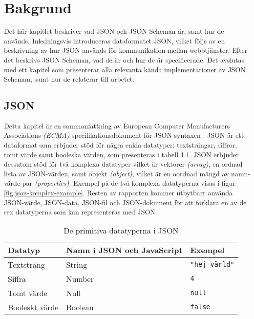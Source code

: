 \chapter{Bakgrund}
\label{sec:teori}
Det här kapitlet beskriver vad JSON och JSON Scheman är, samt hur de används. Inledningsvis introduceras dataformatet JSON, vilket följs av en beskrivning av hur JSON används för kommunikation mellan webbtjänster. Efter det beskrivs JSON Scheman, vad de är och hur de är specificerade. Det avslutas med ett kapitel som presenterar alla relevanta kända implementationer av JSON Scheman, samt hur de relaterar till arbetet.

\section{JSON}
\label{sec:teori:json}
Detta kapitel är en sammanfattning av European Computer Manufacturers Associations \textit{(ECMA)} specifikationsdokument för JSON syntaxen  \cite{ECMA2013}. JSON är ett dataformat som erbjuder stöd för några enkla datatyper: textsträngar, siffror, tomt värde samt booleska värden, som presenteras i tabell \ref{tab:json-primitives}. JSON erbjuder dessutom stöd för två komplexa datatyper vilket är vektorer \textit{(array)}, en ordnad lista av JSON-värden, samt objekt \textit{(object)}, vilket är en oordnad mängd av namn-värde-par \textit{(properties)}. Exempel på de två komplexa datatyperna visas i figur \ref{fig:json-komplex-example}. Resten av rapporten kommer utbytbart använda JSON-värde, JSON-data, JSON-fil och JSON-dokument för att förklara en av de sex datatyperna som kan representeras med JSON. \cite{ECMA2013}

\begin{table}
	\centering
	\caption{De primitiva datatyperna i JSON}
	\label{tab:json-primitives}
	\begin{tabular}{ | l | l | l | }
		\hline
		Datatyp & Namn i JSON och JavaScript & Exempel \\
		\hline
		Textsträng & String & \texttt{"hej värld"} \\
		\hline
		Siffra & Number & \texttt{4} \\
		\hline
		Tomt värde & Null & \texttt{null} \\
		\hline
		Booleskt värde & Boolean & \texttt{false} \\
		\hline
	\end{tabular}
\end{table}

